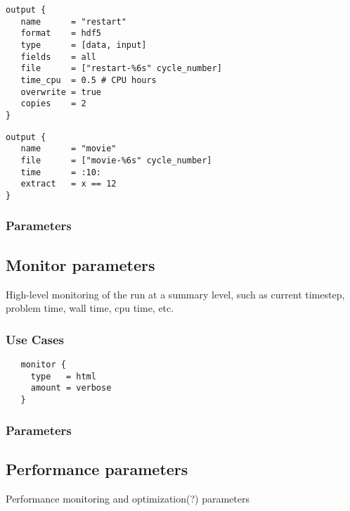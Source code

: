 \begin{verbatim}
output { 
   name      = "restart"
   format    = hdf5
   type      = [data, input]
   fields    = all
   file      = ["restart-%6s" cycle_number]
   time_cpu  = 0.5 # CPU hours
   overwrite = true
   copies    = 2
}
\end{verbatim}

\begin{verbatim}
output { 
   name      = "movie"
   file      = ["movie-%6s" cycle_number]
   time      = :10:
   extract   = x == 12
}
\end{verbatim}


\subsubsection{Parameters}


\subsection{Monitor parameters} \label{ss:params-monitor}

High-level monitoring of the run at a summary level, such as current
timestep, problem time, wall time, cpu time, etc.


\subsubsection{Use Cases}

\begin{verbatim}
   monitor {
     type   = html
     amount = verbose
   }
\end{verbatim}

\subsubsection{Parameters}


\subsection{Performance parameters} \label{ss:parames-performance}

Performance monitoring and optimization(?) parameters

